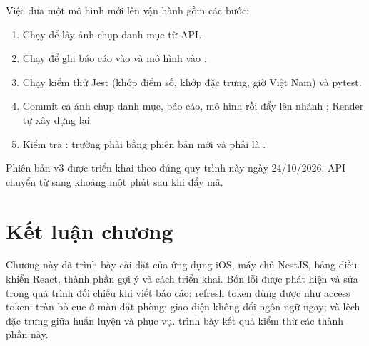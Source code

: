 Việc đưa một mô hình mới lên vận hành gồm các bước:
\begin{enumerate}
\item Chạy  để lấy ảnh chụp danh mục từ API.
\item Chạy  để ghi báo cáo vào  và mô hình vào .
\item Chạy kiểm thử Jest (khớp điểm số, khớp đặc trưng, giờ Việt Nam) và pytest.
\item Commit cả ảnh chụp danh mục, báo cáo, mô hình rồi đẩy lên nhánh ; Render tự xây dựng lại.
\item Kiểm tra : trường  phải bằng phiên bản mới và  phải là .
\end{enumerate}
Phiên bản v3 được triển khai theo đúng quy trình này ngày 24/10/2026. API chuyển từ  sang  khoảng một phút sau khi đẩy mã.

\section{Kết luận chương}

Chương này đã trình bày cài đặt của ứng dụng iOS, máy chủ NestJS, bảng điều khiển React, thành phần gợi ý và cách triển khai. Bốn lỗi được phát hiện và sửa trong quá trình đối chiếu khi viết báo cáo: refresh token dùng được như access token; tràn bố cục ở màn đặt phòng; giao diện không đổi ngôn ngữ ngay; và lệch đặc trưng giữa huấn luyện và phục vụ.  trình bày kết quả kiểm thử các thành phần này.
